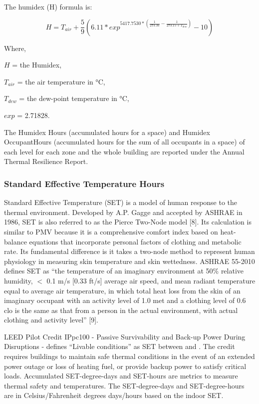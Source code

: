 The humidex (H) formula is:

\begin{equation}  \label{eq:rm-5}
H = T_{air} + \frac{5}{9}(6.11 * exp^{5417.7530 * (\frac{1}{273.16} - \frac{1}{273.15 + T_{dew}})} - 10)
\end{equation}

Where,

$H$ = the Humidex,

$T_{air}$ = the air temperature in \si{\celsius},

$T_{dew}$ = the dew-point temperature in \si{\celsius},

$exp$ = 2.71828.

The Humidex Hours (accumulated hours for a space) and Humidex OccupantHours
(accumulated hours for the sum of all occupants in a space) of each level for
each zone and the whole building are reported under the Annual Thermal
Resilience Report.

\subsubsection{Standard Effective Temperature Hours}\label{set-hour}
Standard Effective Temperature (SET) is a model of human response to the thermal
environment. Developed by A.P. Gagge and accepted by ASHRAE in 1986, SET is also
referred to as the Pierce Two-Node model [8]. Its calculation is similar to PMV
because it is a comprehensive comfort index based on heat-balance equations that
incorporate personal factors of clothing and metabolic rate. Its fundamental
difference is it takes a two-node method to represent human physiology in
measuring skin temperature and skin wettedness. ASHRAE 55-2010 defines SET as
``the temperature of an imaginary environment at 50\% relative humidity, $<$ 0.1
m/s [0.33 ft/s] average air speed, and mean radiant temperature equal to average
air temperature, in which total heat loss from the skin of an imaginary occupant
with an activity level of 1.0 met and a clothing level of 0.6 clo is the same as
that from a person in the actual environment, with actual clothing and activity
level'' [9].

LEED Pilot Credit IPpc100 - Passive Survivability and Back-up Power During
Disruptions - defines ``Livable conditions'' as SET between  and
. The credit requires buildings to maintain safe thermal
conditions in the event of an extended power outage or loss of heating fuel, or
provide backup power to satisfy critical loads. Accumulated SET-degree-days and
SET-hours are metrics to measure thermal safety and temperatures. The SET-degree-days
and SET-degree-hours are in Celsius/Fahrenheit degrees days/hours based on the indoor SET.

